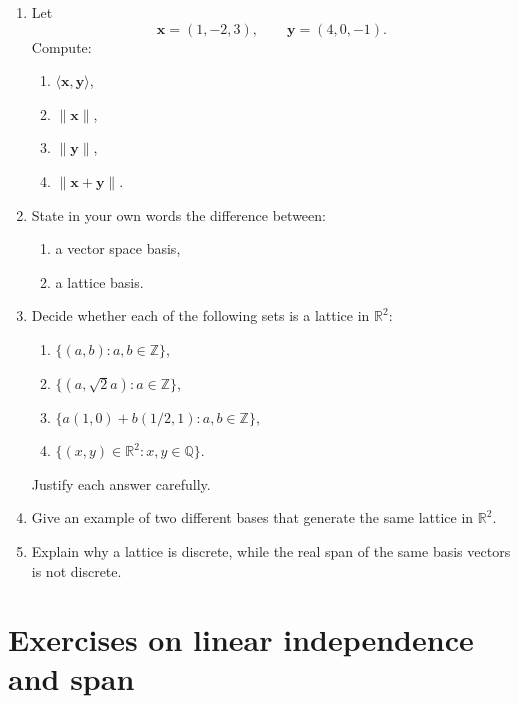 \documentclass[11pt]{article}
\begin{document}
\begin{enumerate}
	\item Let
	\[
	\mathbf{x}=(1,-2,3), \qquad \mathbf{y}=(4,0,-1).
	\]
	Compute:
	\begin{enumerate}
		\item \(\langle \mathbf{x},\mathbf{y}\rangle\),
		\item \(\|\mathbf{x}\|\),
		\item \(\|\mathbf{y}\|\),
		\item \(\|\mathbf{x}+\mathbf{y}\|\).
	\end{enumerate}
	
	\item State in your own words the difference between:
	\begin{enumerate}
		\item a vector space basis,
		\item a lattice basis.
	\end{enumerate}
	
	\item Decide whether each of the following sets is a lattice in \(\mathbb{R}^2\):
	\begin{enumerate}
		\item \(\{(a,b): a,b\in\mathbb{Z}\}\),
		\item \(\{(a,\sqrt{2}a): a\in\mathbb{Z}\}\),
		\item \(\{a(1,0)+b(1/2,1): a,b\in\mathbb{Z}\}\),
		\item \(\{(x,y)\in\mathbb{R}^2: x,y\in\mathbb{Q}\}\).
	\end{enumerate}
	Justify each answer carefully.
	
	\item Give an example of two different bases that generate the same lattice in \(\mathbb{R}^2\).
	
	\item Explain why a lattice is discrete, while the real span of the same basis vectors is not discrete.
\end{enumerate}

\section{Exercises on linear independence and span}
\end{document}
